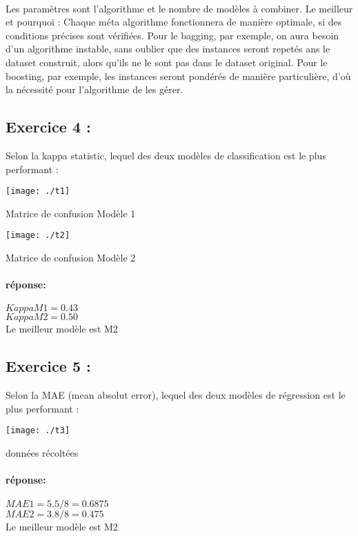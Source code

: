 \documentclass[a4paper, 12pt]{article}
\begin{document}
	\paragraph{}Les paramètres sont l’algorithme et le nombre de modèles à combiner. Le meilleur et pourquoi : Chaque méta algorithme fonctionnera de manière optimale, si des conditions précises sont vérifiées. Pour le bagging, par exemple, on aura besoin d’un algorithme instable, sans oublier que des instances seront repetés ans le dataset construit, alors qu’ils ne le sont pas dans le dataset original. Pour le boosting, par exemple, les instances seront pondérés de manière particulière, d’où la nécessité pour l’algorithme de les gérer.
	
	\subsection*{Exercice 4 :   } Selon la kappa statistic, lequel des deux modèles de classification est le plus performant : 
	
	
	\begin{table}[h]
		\centering
		\texttt{[image: ./t1]}
		\caption{Matrice de confusion Modèle 1}
	\end{table}
	\begin{table}[h]
		\centering
		\texttt{[image: ./t2]}
		\caption{Matrice de confusion Modèle 2}
	\end{table}
	\paragraph{réponse: } $Kappa M1 = 0.43$ \\       $Kappa M2 = 0.50$\\ Le meilleur modèle est M2
	\newpage
	\subsection*{Exercice 5 :}  Selon la MAE (mean absolut error), lequel des deux modèles de régression est le plus performant :
	\begin{table}[h]
		\centering
		\texttt{[image: ./t3]}
		\caption{données récoltées}
	\end{table}
	\paragraph{réponse: } $MAE1 = 5.5/8 = 0.6875$ \\       $MAE2 = 3.8/8 = 0.475$\\ Le meilleur modèle est M2
	 
	
\end{document}
